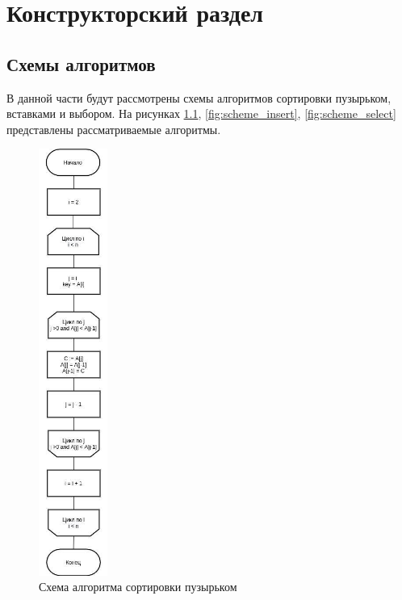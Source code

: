 \chapter{Конструкторский раздел}
\label{cha:design}

\section{Схемы алгоритмов}
В данной части будут рассмотрены схемы алгоритмов сортировки пузырьком, вставками и выбором. На рисунках \ref{fig:scheme_bubble}, \ref{fig:scheme_insert}, \ref{fig:scheme_select} представлены рассматриваемые алгоритмы.


\begin{figure}[h]
    \centering
    \includegraphics[width=0.2\textwidth]{img/flowcharts/bubble.jpg}
    \caption{Схема алгоритма сортировки пузырьком}
    \label{fig:scheme_bubble}
\end{figure} 

